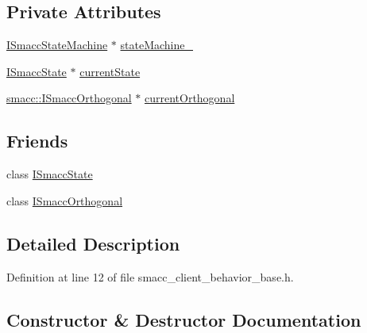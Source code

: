 \subsection*{Private Attributes}
\begin{DoxyCompactItemize}
\item 
\hyperlink{classsmacc_1_1ISmaccStateMachine}{I\+Smacc\+State\+Machine} $\ast$ \hyperlink{classsmacc_1_1ISmaccClientBehavior_a0fea65db292a8bb3dfba3e5840491d79}{state\+Machine\+\_\+}
\item 
\hyperlink{classsmacc_1_1ISmaccState}{I\+Smacc\+State} $\ast$ \hyperlink{classsmacc_1_1ISmaccClientBehavior_a5a6658a2deb72b700ae595e594617616}{current\+State}
\item 
\hyperlink{classsmacc_1_1ISmaccOrthogonal}{smacc\+::\+I\+Smacc\+Orthogonal} $\ast$ \hyperlink{classsmacc_1_1ISmaccClientBehavior_a0d606b804769a11b4f672243a014bed8}{current\+Orthogonal}
\end{DoxyCompactItemize}
\subsection*{Friends}
\begin{DoxyCompactItemize}
\item 
class \hyperlink{classsmacc_1_1ISmaccClientBehavior_ab907e4cdbf326246355f56640780162e}{I\+Smacc\+State}
\item 
class \hyperlink{classsmacc_1_1ISmaccClientBehavior_a7205cc84a71fea903124d54d01e99a68}{I\+Smacc\+Orthogonal}
\end{DoxyCompactItemize}


\subsection{Detailed Description}


Definition at line 12 of file smacc\+\_\+client\+\_\+behavior\+\_\+base.\+h.



\subsection{Constructor \& Destructor Documentation}
\mbox{\label{classsmacc_1_1ISmaccClientBehavior_a12fe603a4b66efe6c190c63da422c7d7}} 
